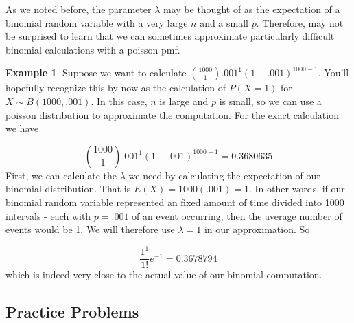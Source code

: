 \documentclass[
]{book}
\theoremstyle{definition}
\theoremstyle{definition}
\newtheorem{example}{Example}[chapter]
\theoremstyle{definition}
\theoremstyle{definition}
\theoremstyle{remark}
\begin{document}
As we noted before, the parameter \(\lambda\) may be thought of as the expectation of a binomial random variable with a very large \(n\) and a small \(p\). Therefore, may not be surprised to learn that we can sometimes approximate particularly difficult binomial calculations with a poisson pmf.

\begin{example}
Suppose we want to calculate \({1000 \choose 1} .001^{1}(1-.001)^{1000-1}\). You'll hopefully recognize this by now as the calculation of \(P(X=1)\) for \(X \sim B(1000,.001)\). In this case, \(n\) is large and \(p\) is small, so we can use a poisson distribution to approximate the computation. For the exact calculation we have

\[
{1000 \choose 1} .001^{1}(1-.001)^{1000-1} = 0.3680635
\]
First, we can calculate the \(\lambda\) we need by calculating the expectation of our binomial distribution. That is \(E(X) = 1000(.001) = 1\). In other words, if our binomial random variable represented an fixed amount of time divided into 1000 intervals - each with \(p = .001\) of an event occurring, then the average number of events would be 1. We will therefore use \(\lambda = 1\) in our approximation. So

\[
\frac{1^{1}}{1!} e^{-1} = 0.3678794
\]
which is indeed very close to the actual value of our binomial computation.
\end{example}

\subsection{Practice Problems}\label{practice-problems}
\end{document}
